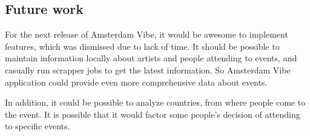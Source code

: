 \documentclass[12pt, a4paper, lithuanian]{article}
\begin{document}
\subsection{Future work}

  For the next release of Amsterdam Vibe, it would be awesome to implement features, which was dismissed due to lack of time. It should be possible to maintain information locally about artists and people attending to events, and casually run scrapper jobs to get the latest information. So Amsterdam Vibe application could provide even more comprehensive data about events.

  In addition, it could be possible to analyze countries, from where people come to the event. It is possible that it would factor some people's decision of attending to specific events.
\end{document}
